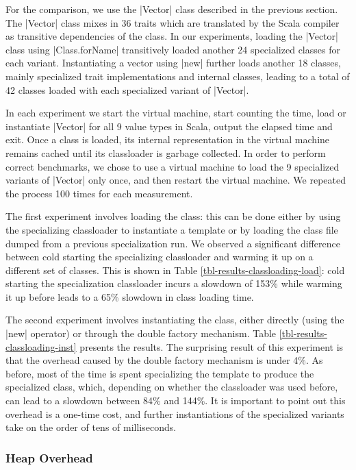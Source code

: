 For the comparison, we use the |Vector| class described in the previous section. The |Vector| class mixes in 36 traits \cite{scalable-component-abstractions} which are translated by the Scala compiler as transitive dependencies of the class. In our experiments, loading the |Vector| class using |Class.forName| transitively loaded another 24 specialized classes for each variant. Instantiating a vector using |new| further loads another 18 classes, mainly specialized trait implementations and internal classes, leading to a total of 42 classes loaded with each specialized variant of |Vector|. 

In each experiment we start the virtual machine, start counting the time, load or instantiate |Vector| for all 9 value types in Scala, output the elapsed time and exit. Once a class is loaded, its internal representation in the virtual machine remains cached until its classloader is garbage collected. In order to perform correct benchmarks, we chose to use a virtual machine to load the 9 specialized variants of |Vector| only once, and then restart the virtual machine. We repeated the process 100 times for each measurement. 

The first experiment involves loading the class: this can be done either by using the specializing classloader to instantiate a template or by loading the class file dumped from a previous specialization run. We observed a significant difference between cold starting the specializing classloader and warming it up on a different set of classes. This is shown in Table \ref{tbl-results-classloading-load}: cold starting the specialization classloader incurs a slowdown of 153\% while warming it up before leads to a 65\% slowdown in class loading time.   

The second experiment involves instantiating the class, either directly (using the |new| operator) or through the double factory mechanism. Table \ref{tbl-results-classloading-inst} presents the results. The surprising result of this experiment is that the overhead caused by the double factory mechanism is under 4\%. As before, most of the time is spent specializing the template to produce the specialized class, which, depending on whether the classloader was used before, can lead to a slowdown between 84\% and 144\%. It is important to point out this overhead is a one-time cost, and further instantiations of the specialized variants take on the order of tens of milliseconds. 

\subsubsection{Heap Overhead}

